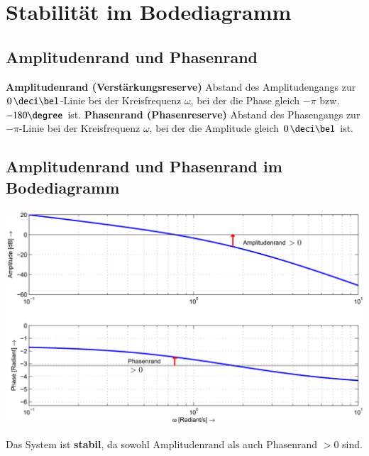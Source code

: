 \section{Stabilität im Bodediagramm}



\subsection{Amplitudenrand und Phasenrand }

\begin{outline}
    \1 \textbf{Amplitudenrand (Verstärkungsreserve)}
        \2 Abstand des Amplitudengangs zur $0 \, \deci \bel$-Linie bei der Kreisfrequenz $\omega$, bei der die Phase 
        gleich $- \pi$ bzw. $- 180 \degree$ ist.
    \1 \textbf{Phasenrand (Phasenreserve)}
        \2 Abstand des Phasengangs zur $- \pi$-Linie bei der Kreisfrequenz $\omega$, bei der die Amplitude 
        gleich $0 \, \deci \bel$ ist.
\end{outline}


\subsection{Amplitudenrand und Phasenrand im Bodediagramm}

\begin{minipage}[c]{0.65\columnwidth}
    \includegraphics[width=\columnwidth]{images/bode_amplitudenrand_phasenrand.png}
\end{minipage}
\hfill
\begin{minipage}[c]{0.32\columnwidth}
    Das System ist \textbf{stabil}, da sowohl Amplitudenrand als auch Phasenrand $> 0$ sind.
\end{minipage}

